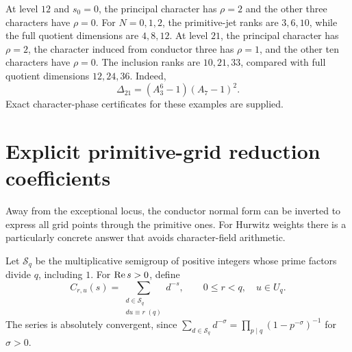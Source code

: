 \begin{example}
At level $12$ and $s_0=0$, the principal character has $\rho=2$ and the
other three characters have $\rho=0$. For $N=0,1,2$, the primitive-jet
ranks are $3,6,10$, while the full quotient dimensions are $4,8,12$.
At level $21$, the principal character has $\rho=2$, the character
induced from conductor three has $\rho=1$, and the other ten
characters have $\rho=0$. The inclusion ranks are $10,21,33$, compared
with full quotient dimensions $12,24,36$. Indeed,
\[
 \Delta_{21}=(A_3^6-1)(A_7-1)^2.
\]
Exact character-phase certificates for these examples are supplied.
\end{example}

\section{Explicit primitive-grid reduction coefficients}\label{jets:sec:primitive}

Away from the exceptional locus, the conductor normal form can be
inverted to express all grid points through the primitive ones. For
Hurwitz weights there is a particularly concrete answer that avoids
character-field arithmetic.

Let $\mathcal S_q$ be the multiplicative semigroup of positive integers
whose prime factors divide $q$, including $1$. For $\operatorname{Re} s>0$, define
\begin{equation}\label{jets:eq:C-smooth}
 C_{r,u}(s)=\sum_{\substack{d\in\mathcal S_q\\du\equiv r\; (q)}}d^{-s},
 \qquad 0\le r<q,\quad u\in U_q.
\end{equation}
The series is absolutely convergent, since
$\sum_{d\in\mathcal S_q}d^{-\sigma}
=\prod_{p\mid q}(1-p^{-\sigma})^{-1}$ for $\sigma>0$.

